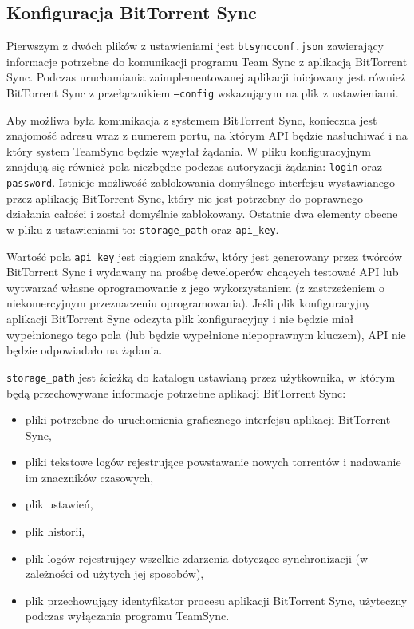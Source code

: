 \documentclass[polish,a4paper,twoside]{ppfcmthesis}
\begin{document}
\subsection{Konfiguracja BitTorrent Sync}

\label{configbtsync}

Pierwszym z dwóch plików z ustawieniami jest \texttt{btsyncconf.json} zawierający informacje potrzebne do komunikacji programu Team Sync z aplikacją BitTorrent Sync. Podczas uruchamiania zaimplementowanej aplikacji inicjowany jest również BitTorrent Sync z przełącznikiem \texttt{--config} wskazującym na plik z ustawieniami.

Aby możliwa była komunikacja z systemem BitTorrent Sync, konieczna jest znajomość adresu wraz z numerem portu, na którym API będzie nasłuchiwać i na który system TeamSync będzie wysyłał żądania. W pliku konfiguracyjnym znajdują się również pola niezbędne podczas autoryzacji żądania: \texttt{login} oraz \texttt{password}. Istnieje możliwość zablokowania domyślnego interfejsu wystawianego przez aplikację BitTorrent Sync, który nie jest potrzebny do poprawnego działania całości i został domyślnie zablokowany. Ostatnie dwa elementy obecne w pliku z ustawieniami to: \texttt{storage\_path} oraz \texttt{api\_key}.

Wartość pola \texttt{api\_key} jest ciągiem znaków, który jest generowany przez twórców BitTorrent Sync i wydawany na prośbę deweloperów chcących testować API lub wytwarzać własne oprogramowanie z jego wykorzystaniem (z zastrzeżeniem o niekomercyjnym przeznaczeniu oprogramowania). Jeśli plik konfiguracyjny aplikacji BitTorrent Sync odczyta plik konfiguracyjny i nie będzie miał wypełnionego tego pola (lub będzie wypełnione niepoprawnym kluczem), API nie będzie odpowiadało na żądania.

\texttt{storage\_path} jest ścieżką do katalogu ustawianą przez użytkownika, w którym będą przechowywane informacje potrzebne aplikacji BitTorrent Sync:

\begin{itemize}[noitemsep]
  \item pliki potrzebne do uruchomienia graficznego interfejsu aplikacji BitTorrent Sync,
  
  \item pliki tekstowe logów rejestrujące powstawanie nowych torrentów i nadawanie im znaczników czasowych,
  
  \item plik ustawień,
  
  \item plik historii,
  
  \item plik logów rejestrujący wszelkie zdarzenia dotyczące synchronizacji (w zależności od użytych jej sposobów),
  
  \item plik przechowujący identyfikator procesu aplikacji BitTorrent Sync, użyteczny podczas wyłączania programu TeamSync.
\end{itemize}
\end{document}

